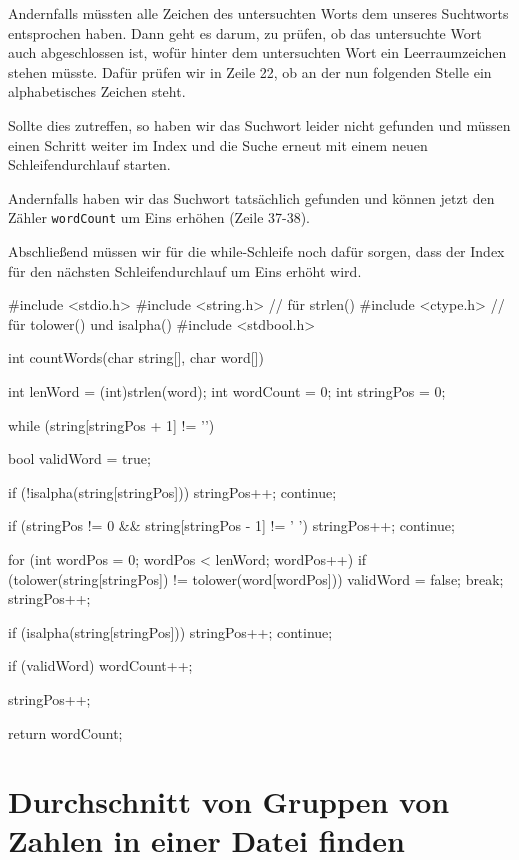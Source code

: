 Andernfalls müssten alle Zeichen des untersuchten Worts dem unseres Suchtworts
entsprochen haben. Dann geht es darum, zu prüfen, ob das untersuchte Wort auch
abgeschlossen ist, wofür hinter dem untersuchten Wort ein Leerraumzeichen stehen
müsste. Dafür prüfen wir in Zeile 22, ob an der nun folgenden Stelle ein
alphabetisches Zeichen steht.

Sollte dies zutreffen, so haben wir das Suchwort leider nicht gefunden und
müssen einen Schritt weiter im Index und die Suche erneut mit einem neuen
Schleifendurchlauf starten.

Andernfalls haben wir das Suchwort tatsächlich gefunden und können jetzt den
Zähler \texttt{wordCount} um Eins erhöhen (Zeile 37-38).

Abschließend müssen wir für die while-Schleife noch dafür sorgen, dass der Index
für den nächsten Schleifendurchlauf um Eins erhöht wird.

\begin{codebox}[lang=c, fontsize=\small, linenos=true]
#include <stdio.h>
#include <string.h> // für strlen()
#include <ctype.h>  // für tolower() und isalpha()
#include <stdbool.h>

int countWords(char string[], char word[]) {
    int lenWord = (int)strlen(word);
    int wordCount = 0;
    int stringPos = 0;

    while (string[stringPos + 1] != '\0') {
        bool validWord = true;

        if (!isalpha(string[stringPos])) {
            stringPos++;
            continue;
        }

        if (stringPos != 0 && string[stringPos - 1] != ' ') {
            stringPos++;
            continue;
        }

        for (int wordPos = 0; wordPos < lenWord; wordPos++) {
            if (tolower(string[stringPos]) != tolower(word[wordPos])) {
                validWord = false;
                break;
            }
            stringPos++;
        }

        if (isalpha(string[stringPos])) {
            stringPos++;
            continue;
        }

        if (validWord)
            wordCount++;

        stringPos++;
    }

    return wordCount;
}
\end{codebox}



\chapter{Durchschnitt von Gruppen von Zahlen in einer Datei finden}

